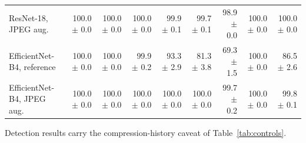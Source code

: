 \begin{table}[t]
\begin{tabular}{lrrrrrrrr}
ResNet-18, JPEG aug. & 100.0 $\pm$ 0.0 & 100.0 $\pm$ 0.0 & 100.0 $\pm$ 0.0 & 99.9 $\pm$ 0.1 & 99.7 $\pm$ 0.1 & 98.9 $\pm$ 0.0 & 100.0 $\pm$ 0.0 & 100.0 $\pm$ 0.0 \\
EfficientNet-B4, reference & 100.0 $\pm$ 0.0 & 100.0 $\pm$ 0.0 & 99.9 $\pm$ 0.2 & 93.3 $\pm$ 2.9 & 81.3 $\pm$ 3.8 & 69.3 $\pm$ 1.5 & 100.0 $\pm$ 0.0 & 86.5 $\pm$ 2.6 \\
EfficientNet-B4, JPEG aug. & 100.0 $\pm$ 0.0 & 100.0 $\pm$ 0.0 & 100.0 $\pm$ 0.0 & 100.0 $\pm$ 0.0 & 100.0 $\pm$ 0.0 & 99.7 $\pm$ 0.2 & 100.0 $\pm$ 0.0 & 99.8 $\pm$ 0.1 \\
\bottomrule
\end{tabular}
\par\smallskip\parbox{\linewidth}{\scriptsize Detection results carry the compression-history caveat of Table~\ref{tab:controls}.}
\end{table}

